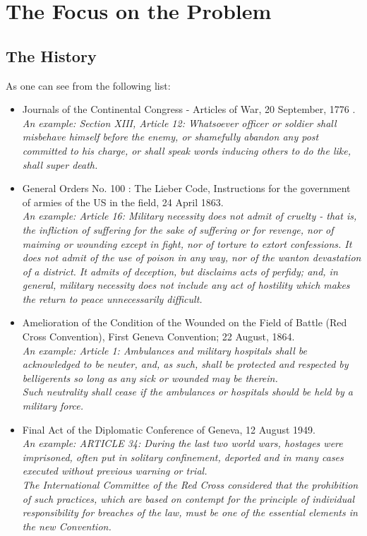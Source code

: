 \section{The Focus on the Problem}

\subsection{The History}

As one can see from the following list:
\begin{itemize}
\setlength{\itemsep}{0.05\baselineskip}
    \item Journals of the Continental Congress - Articles of War, 20 September, 1776 . \cite{ArticlesOfWar1775:online}\\
    \textit{An example: Section XIII, Article 12: Whatsoever officer or soldier shall misbehave himself before the enemy, or shamefully abandon any post committed to his charge, or shall speak words inducing others to do the like, shall super death.}
    \item General Orders No. 100 : The Lieber Code, Instructions for the government of armies of the US in the field, 24 April 1863. \cite{LiberCode1863:online}\\
    \textit{An example: Article 16: Military necessity does not admit of cruelty - that is, the infliction of suffering for the sake of suffering or for revenge, nor of maiming or wounding except in fight, nor of torture to extort confessions. It does not admit of the use of poison in any way, nor of the wanton devastation of a district. It admits of deception, but disclaims acts of perfidy; and, in general, military necessity does not include any act of hostility which makes the return to peace unnecessarily difficult. }
    \item Amelioration of the Condition of the Wounded on the Field of Battle (Red Cross Convention), First Geneva Convention; 22 August, 1864. \cite{1stGenevaConvention1864:online}\\
    \textit{An example: Article 1: Ambulances and military hospitals shall be acknowledged to be neuter, and, as such, shall be protected and respected by belligerents so long as any sick or wounded may be therein.\\
    Such neutrality shall cease if the ambulances or hospitals should be held by a military force. }
    \item Final Act of the Diplomatic Conference of Geneva, 12 August 1949. \cite{FinalGenevaConvention1949:online}\\
    \textit{An example: ARTICLE 34: During the last two world wars, hostages were imprisoned, often put in solitary confinement, deported and in many cases executed without previous warning or trial.\\
    The International Committee of the Red Cross considered that the prohibition of such practices, which are based on contempt for the principle of individual responsibility for breaches of the law, must be one of the essential elements in the new Convention.}
\end{itemize}
